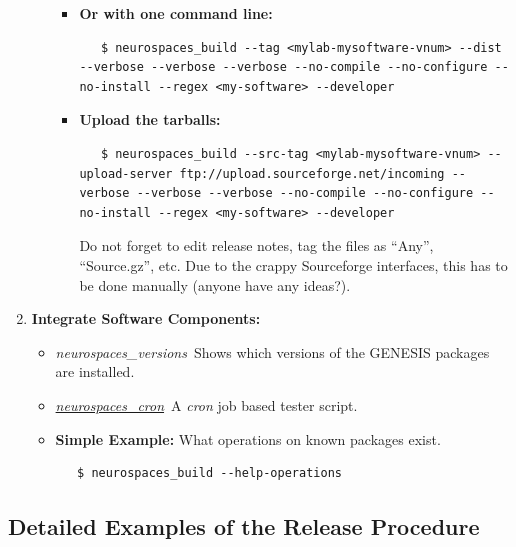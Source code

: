 \documentclass[12pt]{article}
\begin{document}
\begin{enumerate}
\begin{itemize}
\begin{itemize}
         \item {\bf Or with one command line:}
\begin{verbatim}
   $ neurospaces_build --tag <mylab-mysoftware-vnum> --dist --verbose --verbose --verbose --no-compile --no-configure --no-install --regex <my-software> --developer
\end{verbatim}

         \item {\bf Upload the tarballs:}
\begin{verbatim}
   $ neurospaces_build --src-tag <mylab-mysoftware-vnum> --upload-server ftp://upload.sourceforge.net/incoming --verbose --verbose --verbose --no-compile --no-configure --no-install --regex <my-software> --developer
\end{verbatim}
Do not forget to edit release notes, tag the files as ``Any'', ``Source.gz'', etc. Due to the crappy Sourceforge interfaces, this has to be done manually (anyone have any ideas?).
      
   \end{itemize}
\end{itemize}
  
   \item {\bf Integrate Software Components:}
   \begin{itemize}
      \item {\it neurospaces\_versions}\,\,\,Shows which versions of the GENESIS packages are installed.
      \item \href{../neurospaces-cron/neurospaces-cron.tex}{\it neurospaces\_cron}\,\,\,A {\it cron} job based tester script. 
      \item {\bf Simple Example:} What operations on known packages exist.
      \begin{verbatim}
   $ neurospaces_build --help-operations
      \end{verbatim}
   \end{itemize}

\end{enumerate}

\subsection*{Detailed Examples of the Release Procedure}
\end{document}

